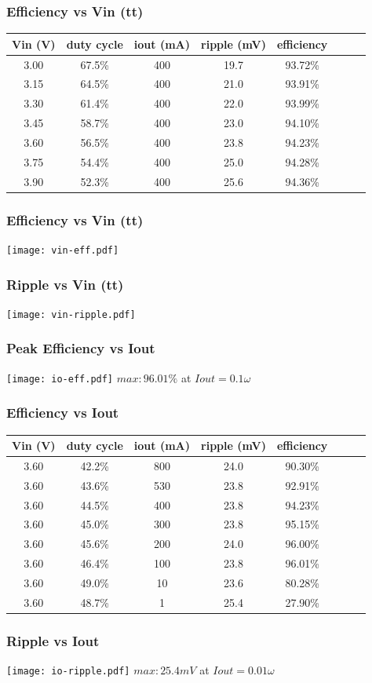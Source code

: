\documentclass{beamer}
\begin{document}
\begin{frame}
  \frametitle{Efficiency vs Vin (tt) }
    \begin{tabular}{| c | c | c | c | c | c | c | c |}
        \hline
            Vin (V)  &  duty cycle &  iout (mA) &   ripple (mV) & efficiency\\\hline
            3.00 &   67.5\% &      400 &    19.7 &       93.72\%\\\hline
            3.15 &   64.5\% &      400 &    21.0 &       93.91\%\\\hline
            3.30 &   61.4\% &      400 &    22.0 &       93.99\%\\\hline
            3.45 &   58.7\% &      400 &    23.0 &       94.10\%\\\hline
            3.60 &   56.5\% &      400 &    23.8 &       94.23\%\\\hline
            3.75 &   54.4\% &      400 &    25.0 &       94.28\%\\\hline
            3.90 &   52.3\% &      400 &    25.6 &       94.36\%\\\hline
    \end{tabular}
\end{frame}

\begin{frame}
  \frametitle{Efficiency vs Vin (tt) }
  \texttt{[image: vin-eff.pdf]}
\end{frame}

\begin{frame}
  \frametitle{Ripple vs Vin (tt)}
  \texttt{[image: vin-ripple.pdf]}
\end{frame}

\begin{frame}
  \frametitle{Peak Efficiency vs Iout}
  \texttt{[image: io-eff.pdf]}
  $max: 96.01\%$ at $Iout = 0.1 \omega$
\end{frame}

\begin{frame}
  \frametitle{Efficiency vs Iout}
    \begin{tabular}{| c | c | c | c | c | c | c | c |}
        \hline
            Vin (V) &    duty cycle &   iout (mA) &   ripple (mV) & efficiency\\\hline
            3.60 &   42.2\% &800 &    24.0 &      90.30\%\\\hline
            3.60 &   43.6\% &530 &    23.8 &      92.91\%\\\hline
            3.60 &   44.5\% &400 &    23.8 &      94.23\%\\\hline
            3.60 &   45.0\% &300 &    23.8 &      95.15\%\\\hline
            3.60 &   45.6\% &200 &    24.0 &      96.00\%\\\hline
            3.60 &   46.4\% &100 &    23.8 &      96.01\%\\\hline
            3.60 &   49.0\% &10  &    23.6 &      80.28\%\\\hline
            3.60 &   48.7\% &1   &    25.4 &      27.90\%\\\hline
    \end{tabular}
\end{frame}

\begin{frame}
  \frametitle{Ripple vs Iout}
  \texttt{[image: io-ripple.pdf]}
  $max: 25.4 mV$ at $Iout = 0.01 \omega$
\end{frame}
\end{document}
